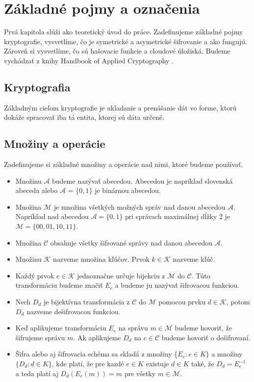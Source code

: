 \chapter{Základné pojmy a označenia}

Prvá kapitola slúži ako teoretický úvod do práce. Zadefinujeme základné pojmy kryptografie, vysvetlíme, čo je symetrické a asymetrické šifrovanie a ako fungujú. Zároveň si vysvetlíme, čo sú hašovacie funkcie a cloudové úložiská. Budeme vychádzať z knihy Handbook of Applied Cryptography \cite{HOAC}.

\section{Kryptografia}
	Základným cieľom kryptografie je ukladanie a prenášanie dát vo forme, ktorú dokáže spracovať iba tá entita, ktorej sú dáta určené.

\section{Množiny a operácie}
	Zadefinujeme si základné množiny a operácie nad nimi, ktoré budeme používať.
	\begin{itemize}
	\item Množinu $\mathcal A$ budeme nazývať abecedou. Abecedou je napríklad slovenská abeceda alebo $\mathcal A$ =  $\{0,1\}$ je binárnou abecedou.
	\item Množina $\mathcal M$ je množina všetkých možných správ nad danou abecedou $\mathcal A$. Napríklad nad abecedou $\mathcal A = \{0,1\}$ pri správach maximálnej dĺžky 2 je  $ \mathcal M = \{00,01,10,11\}$.
	\item Množina $\mathcal C$ obsahuje všetky šifrované správy nad danou abecedou $\mathcal A$.  
	\item Množinu $\mathcal K$ nazveme množina kľúčov. Prvok $k \in\mathcal K$ nazveme kľúč.
	\item Každý prvok $e \in \mathcal K$ jednoznačne určuje bijekciu z $\mathcal M$ do $\mathcal C$. Túto transformáciu budeme značiť $E_e$ a budeme ju nazývať šifrovacou funkciou.
	\item Nech $D_d$ je bijektívna transformácia z $\mathcal C$ do $\mathcal M$ pomocou prvku  $d \in \mathcal K$, potom  $D_d$ nazveme dešifrovacou funkciou.
	\item Keď aplikujeme transformáciu $E_e$ na správu $m \in \mathcal M$ budeme hovoriť, že šifrujeme správu $m$. Ak aplikujeme $D_d$ na $c \in \mathcal C$ budeme hovoriť o dešifrovaní.
	\item Šifra alebo aj šifrovacia schéma sa skladá z množiny $\{E_e : e \in K\}$ a množiny $\{D_d : d \in K\}$, kde platí, že pre kazdé $e \in K$ existuje $d \in K$ také, že $D_d = E_e^{-1}$ a teda platí aj $D_d(E_e(m)) = m$ pre všetky $m \in \mathcal M$.  
	\end{itemize}

